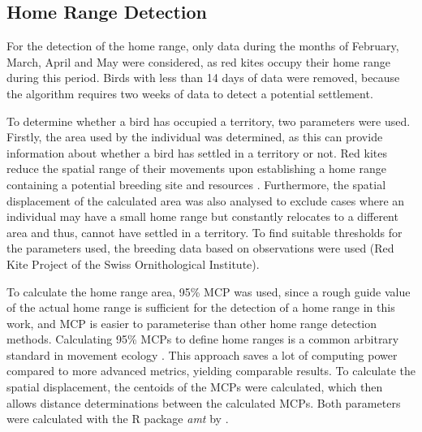 \subsection{Home Range Detection} \label{subsection:homerange}
For the detection of the home range, only data during the months of February, March, April and May were considered, as red kites occupy their home range during this period. Birds with less than 14 days of data were removed, because the algorithm requires two weeks of data to detect a potential settlement.

To determine whether a bird has occupied a territory, two parameters were used. Firstly, the area used by the individual was determined, as this can provide information about whether a bird has settled in a territory or not. Red kites reduce the spatial range of their movements upon establishing a home range containing a potential breeding site and resources \parencite{spatz2022sex}. Furthermore, the spatial displacement of the calculated area was also analysed to exclude cases where an individual may have a small home range but constantly relocates to a different area and thus, cannot have settled in a territory. To find suitable thresholds for the parameters used, the breeding data based on observations were used (Red Kite Project of the Swiss Ornithological Institute).

To calculate the home range area, 95\% MCP was used, since a rough guide value of the actual home range is sufficient for the detection of a home range in this work, and MCP is easier to parameterise than other home range detection methods. Calculating 95\% MCPs to define home ranges is a common arbitrary standard in movement ecology \parencite{fieberg2007kernel, hasselblad2007male, kernohan2001analysis, laver2008critical, signer2021fresh}. This approach saves a lot of computing power compared to more advanced metrics, yielding comparable results. To calculate the spatial displacement, the centoids of the MCPs were calculated, which then allows distance determinations between the calculated MCPs. Both parameters were calculated with the R package \textit{amt} by \textcite{signer2019amt}.

